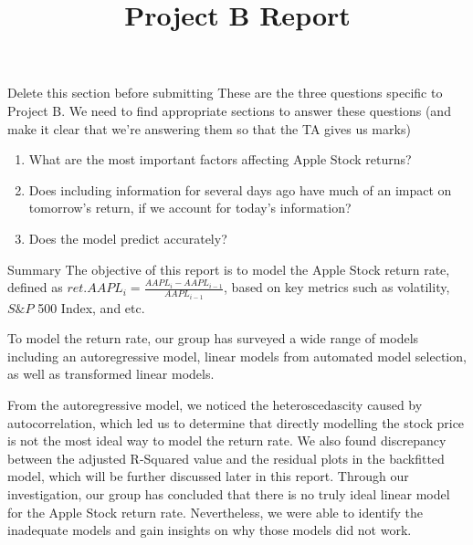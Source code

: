 \documentclass[]{article}
\title{\bf{Project B Report}}
\author{}
\date{}
\begin{document}
\maketitle

\begin{section}{Delete this section before submitting}
These are the three questions specific to Project B. We need to find appropriate sections to answer these questions (and make it clear that we're answering them so that the TA gives us marks)
\begin{enumerate}
\item{}
What are the most important factors affecting Apple Stock returns?
\item{}
Does including information for several days ago have much of an impact on tomorrow’s
return, if we account for today’s information?
\item{}
Does the model predict accurately?
\end{enumerate}
\end{section}

\begin{section}{Summary}
The objective of this report is to model the Apple Stock return rate, defined as $ret.AAPL_i = \frac{AAPL_i - AAPL_{i-1}}{AAPL_{i-1}}$, based on key metrics such as volatility, $S\&P$ 500 Index, and etc. 

To model the return rate, our group has surveyed a wide range of models including an autoregressive model, linear models from automated model selection, as well as transformed linear models. 

From the autoregressive model, we noticed the heteroscedascity caused by autocorrelation, which led us to determine that directly modelling the stock price is not the most ideal way to model the return rate. We also found discrepancy between the adjusted R-Squared value and the residual plots in the backfitted model, which will be further discussed later in this report. Through our investigation, our group has concluded that there is no truly ideal linear model for the Apple Stock return rate. Nevertheless, we were able to identify the inadequate models and gain insights on why those models did not work.
\end{section}
\end{document}

